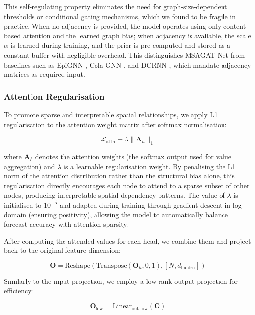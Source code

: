 \documentclass[a4paper,fleqn]{cas-dc}
\begin{document}
This self-regulating property eliminates the need for graph-size-dependent thresholds or conditional gating mechanisms, which we found to be fragile in practice. When no adjacency is provided, the model operates using only content-based attention and the learned graph bias; when adjacency is available, the scale $\alpha$ is learned during training, and the prior is pre-computed and stored as a constant buffer with negligible overhead. This distinguishes MSAGAT-Net from baselines such as EpiGNN \cite{xie2022epignn}, Cola-GNN \cite{dengColaGNNCrosslocationAttention2020a}, and DCRNN \cite{li2017diffusion}, which mandate adjacency matrices as required input.

\subsubsection{Attention Regularisation}

To promote sparse and interpretable spatial relationships, we apply L1 regularisation to the attention weight matrix after softmax normalisation:

\begin{equation}
\mathcal{L}_{\text{attn}} = \lambda \|\mathbf{A}_h\|_1
\end{equation}

where $\mathbf{A}_h$ denotes the attention weights (the softmax output used for value aggregation) and $\lambda$ is a learnable regularisation weight. By penalising the L1 norm of the attention distribution rather than the structural bias alone, this regularisation directly encourages each node to attend to a sparse subset of other nodes, producing interpretable spatial dependency patterns. The value of $\lambda$ is initialised to $10^{-5}$ and adapted during training through gradient descent in log-domain (ensuring positivity), allowing the model to automatically balance forecast accuracy with attention sparsity.

After computing the attended values for each head, we combine them and project back to the original feature dimension:

\begin{equation}
\mathbf{O} = \text{Reshape}(\text{Transpose}(\mathbf{O}_h, 0, 1), [N, d_{\text{hidden}}])
\end{equation}

Similarly to the input projection, we employ a low-rank output projection for efficiency:

\begin{equation}
\mathbf{O}_{\text{low}} = \text{Linear}_{\text{out\_low}}(\mathbf{O})
\end{equation}
\end{document}

